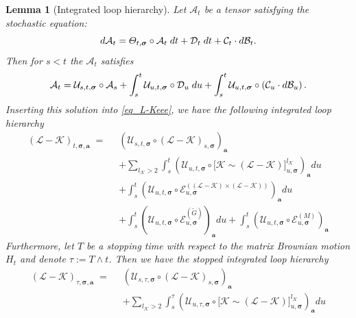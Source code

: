 \documentclass[10pt,reqno]{article}
\theoremstyle{plain} %
\newtheorem{lemma}[theorem]{Lemma}
\theoremstyle{remark}
\numberwithin{equation}{section}
\begin{document}
\begin{lemma}[Integrated loop hierarchy] 
    \label{Sol_CalL}
Let $\mathcal{A}_t$ be a tensor satisfying the stochastic equation:
$$
    d \mathcal{A}_t = {\varTheta}_{t, \boldsymbol{\sigma}} \circ \mathcal{A}_t \; dt + \mathcal{D}_t \; dt + \mathcal{C}_t \cdot d{\cal B}_t.
$$
Then for $s<t$ the $\mathcal{A}_t$ satisfies
 $$
    \mathcal{A}_t = \mathcal{U}_{s, t, \boldsymbol{\sigma}} \circ \mathcal{A}_s +
    \int_{s}^t \mathcal{U}_{u, t, \boldsymbol{\sigma}} \circ \mathcal{D}_u \; du +
    \int_{s}^t \mathcal{U}_{u, t, \boldsymbol{\sigma}} \circ 
    \left(\mathcal{C}_u \cdot d{\cal B}_u\right). 
$$
Inserting this solution into \eqref{eq_L-Keee}, we have the following integrated loop hierarchy  
\begin{align}\label{int_K-LcalE}
    (\mathcal{L} - \mathcal{K})_{t, \boldsymbol{\sigma}, \textbf{a}} \;=\; \; &
    \left(\mathcal{U}_{s, t, \boldsymbol{\sigma}} \circ (\mathcal{L} - \mathcal{K})_{s, \boldsymbol{\sigma}}\right)_{\textbf{a}} \nonumber \\
    &+ \sum_{l_\mathcal{K} > 2} \int_{s}^t \left(\mathcal{U}_{u, t, \boldsymbol{\sigma}} \circ \Big[\mathcal{K} \sim (\mathcal{L} - \mathcal{K})\Big]^{l_\mathcal{K}}_{u, \boldsymbol{\sigma}}\right)_{\textbf{a}} du \nonumber \\
    &+ \int_{s}^t \left(\mathcal{U}_{u, t, \boldsymbol{\sigma}} \circ \mathcal{E}^{((\mathcal{L} - \mathcal{K}) \times (\mathcal{L} - \mathcal{K}))}_{u, \boldsymbol{\sigma}}\right)_{\textbf{a}} du  \nonumber \\
    &+ \int_{s}^t \left(\mathcal{U}_{u, t, \boldsymbol{\sigma}} \circ \mathcal{E}^{(\widetilde{G})}_{u, \boldsymbol{\sigma}}\right)_{\textbf{a}} du + \int_{s}^t \left(\mathcal{U}_{u, t, \boldsymbol{\sigma}} \circ \mathcal{E}^{(M)}_{u, \boldsymbol{\sigma}}\right)_{\textbf{a}}  
\end{align}
Furthermore, let $T$ be a stopping time with respect to the matrix Brownian motion $H_t$ and denote  $\tau:= T\wedge t$. 
Then we have the stopped integrated loop hierarchy  
\begin{align}\label{int_K-L_ST}
   (\mathcal{L} - \mathcal{K})_{\tau , \boldsymbol{\sigma}, \textbf{a}} \;=\; \; &
    \left(\mathcal{U}_{s, \tau, \boldsymbol{\sigma}} \circ (\mathcal{L} - \mathcal{K})_{s, \boldsymbol{\sigma}}\right)_{\textbf{a}}  \nonumber \\
    &+ \sum_{l_\mathcal{K} > 2} \int_{s}^\tau \left(\mathcal{U}_{u, \tau, \boldsymbol{\sigma}} \circ \Big[\mathcal{K} \sim (\mathcal{L} - \mathcal{K})\Big]^{l_\mathcal{K}}_{u, \boldsymbol{\sigma}}\right)_{\textbf{a}} du  \nonumber \\

\end{align}
\end{lemma}
\end{document}
